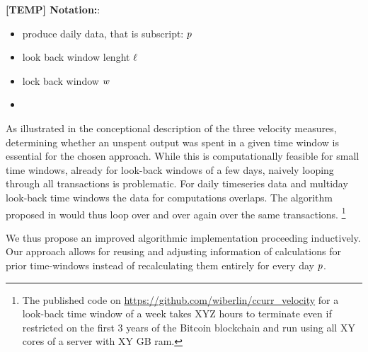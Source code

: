 \textbf{[TEMP] Notation:}:
\begin{itemize}
\item produce daily data, that is subscript: \({p}\)
\item look back window lenght \({\ell}\)
\item lock back window \({w}\)
\item 
\end{itemize}

As illustrated in the conceptional description of the three velocity measures,
determining whether an unspent output was spent in a given time window is essential for
the chosen approach. %
While this is computationally feasible for small time windows, already for look-back windows
of a few days, naively looping through all transactions is problematic. %
For daily timeseries data and multiday look-back time windows the data for computations overlaps. %
The algorithm proposed in \cite{pernice2019cryptocurrencies} would thus loop over
and over again over the same transactions. %
\footnote{The published code on \url{https://github.com/wiberlin/ccurr_velocity} for a look-back time window of a week takes XYZ hours to terminate even if restricted on the first 3 years of the Bitcoin blockchain and run using all XY cores of a server with XY GB ram.}  

We thus propose an improved algorithmic implementation proceeding inductively. %
Our approach allows for reusing and adjusting information of calculations for prior time-windows instead of recalculating them entirely for every day \({p}\). %

